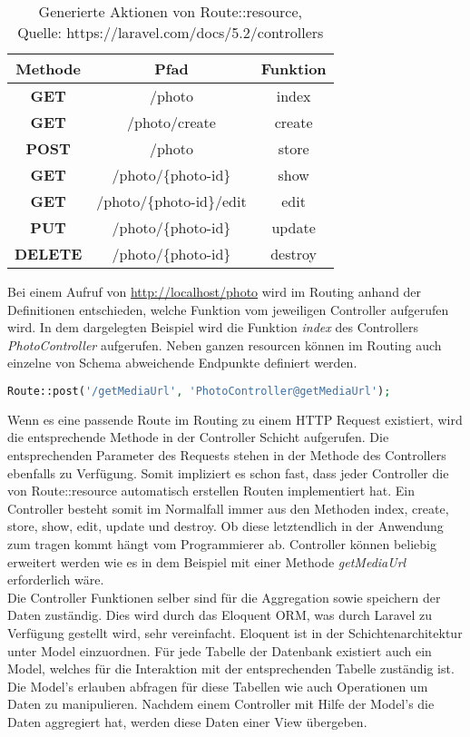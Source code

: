 \renewcommand{\arraystretch}{2}
\begin{table}[hbt]
\centering
\begin{tabular}{c|c|c}
\hline \textbf{Methode} & \textbf{Pfad} & \textbf{Funktion}  \\ 
\hline \textbf{GET} & /photo &  index\\ 
\hline \textbf{GET} & /photo/create & create\\ 
\hline \textbf{POST} & /photo & store \\
\hline \textbf{GET} & /photo/\{photo-id\} &  show\\
\hline \textbf{GET} & /photo/\{photo-id\}/edit &  edit\\
\hline \textbf{PUT} & /photo/\{photo-id\} &  update\\
\hline \textbf{DELETE} & /photo/\{photo-id\} &  destroy \\
\hline 
\end{tabular}
\caption[Generierte Aktionen von Route::resource]{Generierte Aktionen von Route::resource,\\Quelle: https://laravel.com/docs/5.2/controllers }
\label{Routeresource}
\end{table} Bei einem Aufruf von \url{http://localhost/photo} wird im Routing anhand der Definitionen entschieden, welche Funktion vom jeweiligen Controller aufgerufen wird. In dem dargelegten Beispiel wird die Funktion \textit{index} des Controllers \textit{PhotoController} aufgerufen.
Neben ganzen resourcen können im Routing auch einzelne von Schema abweichende Endpunkte definiert werden. \begin{lstlisting}[language=php]
Route::post('/getMediaUrl', 'PhotoController@getMediaUrl');
\end{lstlisting}
Wenn es eine passende Route im Routing zu einem HTTP Request existiert, wird die entsprechende Methode in der Controller Schicht aufgerufen. Die entsprechenden Parameter des Requests stehen in der Methode des Controllers ebenfalls zu Verfügung. Somit impliziert es schon fast, dass jeder Controller die von Route::resource automatisch erstellen Routen implementiert hat. Ein Controller besteht somit im Normalfall immer aus den Methoden index, create, store, show, edit, update und destroy. Ob diese letztendlich in der Anwendung zum tragen kommt hängt vom Programmierer ab. Controller können beliebig erweitert werden wie es in dem Beispiel mit einer Methode \textit{getMediaUrl} erforderlich wäre. 
\\Die Controller Funktionen selber sind für die Aggregation sowie speichern der Daten zuständig. Dies wird durch das Eloquent ORM, was durch Laravel zu Verfügung gestellt wird, sehr vereinfacht. Eloquent ist in der Schichtenarchitektur unter Model einzuordnen. Für jede Tabelle der Datenbank existiert auch ein Model, welches für die Interaktion mit der entsprechenden Tabelle zuständig ist. Die Model's erlauben abfragen für diese Tabellen wie auch Operationen um Daten zu manipulieren. Nachdem einem Controller mit Hilfe der Model's die Daten aggregiert hat, werden diese Daten einer View übergeben.
